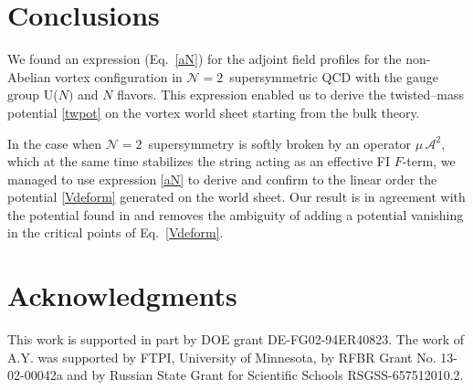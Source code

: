 \documentclass[12pt]{article}
\newcommand{\ntwon}{${\mathcal N}=2$}
\newcommand{\ma}{\mathcal{A}}
\begin{document}
\section{Conclusions}

	We found an expression (Eq.~\eqref{aN}) for the adjoint field profiles 
	for the non-Abelian vortex configuration in \ntwon\, supersymmetric QCD 
	with the gauge group U($N)$ and  $ N $ flavors.
	This expression  enabled us to derive the twisted--mass potential \eqref{twpot} on the 
	vortex world sheet starting from the bulk theory.

	In the case when \ntwon\, supersymmetry is softly broken by an operator $ \mu\, \ma^2 $, 
	which at the same time stabilizes the string acting as an effective FI $ F $-term,
	we managed to use expression \eqref{aN} to derive and confirm to the linear order
	the potential \eqref{Vdeform} generated on the world sheet.
	Our result is in agreement with the potential found in \cite{Shifman:2010kr}
	and removes the ambiguity of adding a potential vanishing in the critical points of Eq.~\eqref{Vdeform}.




\section*{Acknowledgments}

	This work  is supported in part by DOE grant DE-FG02-94ER40823. 
	The work of A.Y. was  supported 
	by  FTPI, University of Minnesota, 
	by RFBR Grant No. 13-02-00042a 
	and by Russian State Grant for 
	Scientific Schools RSGSS-657512010.2.
\end{document}

